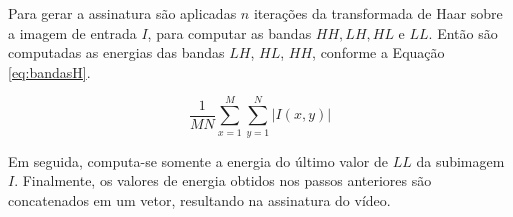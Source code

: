 



 Para gerar a assinatura são aplicadas $n$ iterações da transformada de Haar sobre a imagem de entrada $I$, para computar as bandas $HH, LH, HL$ e $LL$.  Então são computadas as energias das bandas $LH$, $HL$, $HH$, conforme a Equação \ref{eq:bandasH}.
 
 \begin{equation}
	\label{eq:bandasH}
	\frac{1}{MN}\sum_{x=1}^M \sum_{y=1}^N |I(x,y)|
\end{equation} 
 
 
 

 Em seguida, computa-se somente a energia do último valor de $LL$ da subimagem $I$. Finalmente, os valores de energia obtidos nos passos anteriores são concatenados em um vetor, resultando na assinatura do vídeo.

